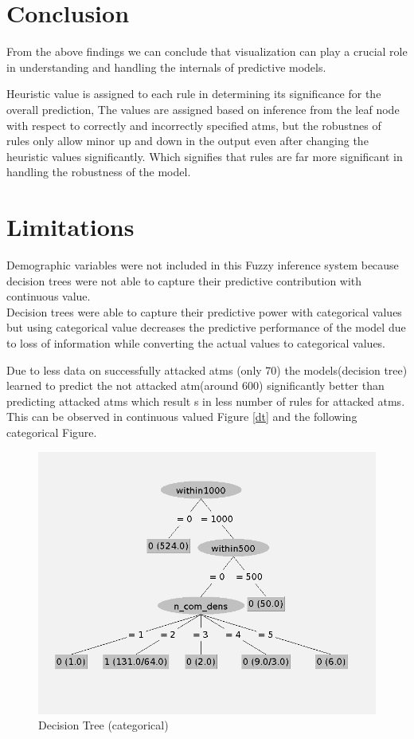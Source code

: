 \documentclass[10pt, conference, compsocconf]{IEEEtran}
\begin{document}
    
    
    
 \section{Conclusion}
 From the above findings we can conclude that visualization can play a crucial role in understanding and handling the internals of predictive models. 
 
	Heuristic value is assigned to each rule in determining its significance for the overall prediction, The values are assigned based on inference from the leaf node with respect to correctly and incorrectly specified atms, but the robustnes of rules only allow minor up and down in the output even after changing the heuristic values significantly. Which signifies that rules are far more significant in handling the robustness of the model.
	
\section{Limitations}

Demographic variables were not included in this Fuzzy inference system because decision trees were not able to capture their predictive contribution with continuous value.\\ Decision trees were able to capture their predictive power with categorical values but using categorical value decreases the predictive performance of the model due to loss of information while converting the actual values to categorical values.

Due to less data on successfully attacked atms (only 70) the models(decision tree) learned to predict the not attacked atm(around 600) significantly better than predicting attacked atms which result s in less number of rules for attacked atms. This can be observed in continuous valued Figure \ref{dt} and the following categorical Figure.


 \begin{figure}[h!]
	\centering
	\includegraphics[width=\linewidth]{DTC.png}
	\caption{Decision Tree (categorical)}
	\label{DTC}
\end{figure}

	
	
	
	
	
	
	
	
	
	
	
\end{document}
